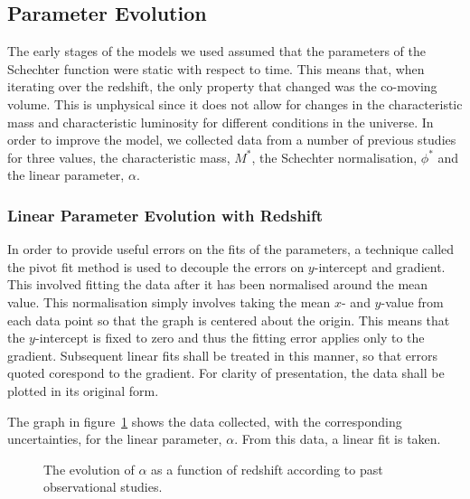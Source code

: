     \subsection{Parameter Evolution} %
    \label{sub:parameter_evolution}
        The early stages of the models we used assumed that the parameters of the Schechter function were static with respect to time. This means that, when iterating over the redshift, the only property that changed was the co-moving volume. This is unphysical since it does not allow for changes in the characteristic mass and characteristic luminosity for different conditions in the universe. In order to improve the model, we collected data from a number of previous studies for three values, the characteristic mass, $M^*$, the Schechter normalisation, $\phi^*$ and the linear parameter, $\alpha$.

        \subsubsection{Linear Parameter Evolution with Redshift} %
        \label{ssub:linear_parameter_evolution_with_redshift}

            In order to provide useful errors on the fits of the parameters, a technique called the pivot fit method is used to decouple the errors on $y$-intercept and gradient. This involved fitting the data after it has been normalised around the mean value. This normalisation simply involves taking the mean $x$- and $y$-value from each data point so that the graph is centered about the origin. This means that the $y$-intercept is fixed to zero and thus the fitting error applies only to the gradient. Subsequent linear fits shall be treated in this manner, so that errors quoted corespond to the gradient. For clarity of presentation, the data shall be plotted in its original form.

            The graph in figure~\ref{fig:alpha_evolution} shows the data collected, with the corresponding uncertainties, for the linear parameter, $\alpha$. From this data, a linear fit is taken.
            \begin{figure}[ht]
                \begin{center}
                    \begingroup{}
                    \resizebox{0.7\textwidth}{!}{%
                        
                    }\endgroup
                    \caption{The evolution of $\alpha$ as a function of redshift according to past observational studies.\label{fig:alpha_evolution}}
                \end{center}
            \end{figure}

